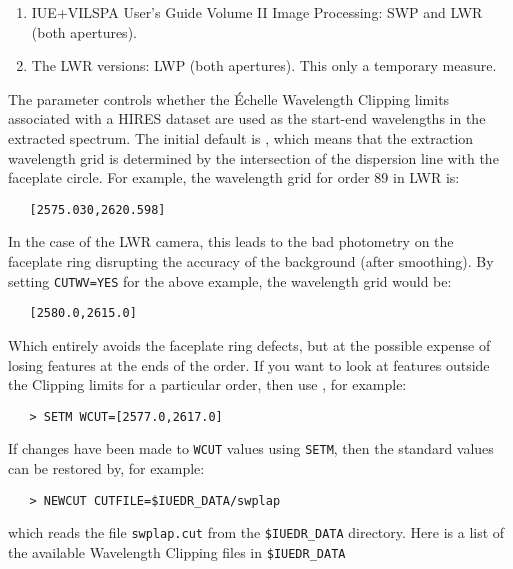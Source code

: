 \begin{enumerate}

\item IUE+VILSPA User's Guide Volume II Image Processing: SWP and LWR (both
      apertures)\@.

\item The LWR versions: LWP (both apertures)\@.  This only a temporary measure.

\end{enumerate}

The 
 parameter controls whether the \'{E}chelle Wavelength Clipping
limits associated with a HIRES dataset are used as the start-end wavelengths
in the extracted spectrum.  The initial default is
, which
means that the extraction wavelength grid is determined by the intersection of
the dispersion line with the faceplate circle.  For example, the wavelength
grid for order 89 in LWR is:

\begin{verbatim}
   [2575.030,2620.598]
\end{verbatim}

In the case of the LWR camera, this leads to the bad photometry on the
faceplate ring disrupting the accuracy of the background (after smoothing).  By
setting \verb+CUTWV=YES+ for the above example, the wavelength grid would be:

\begin{verbatim}
   [2580.0,2615.0]
\end{verbatim}

Which entirely avoids the faceplate ring defects, but at the possible expense
of losing features at the ends of the order.  If you want to look at features
outside the Clipping limits for a particular order, then use
, for example:

\begin{verbatim}
   > SETM WCUT=[2577.0,2617.0]
\end{verbatim}

If changes have been made to \verb+WCUT+ values using \verb+SETM+, then the
standard values can be restored by, for example:

\begin{verbatim}
   > NEWCUT CUTFILE=$IUEDR_DATA/swplap
\end{verbatim}

which reads the file \verb+swplap.cut+ from the \verb+$IUEDR_DATA+
directory.  Here is a list of the available Wavelength Clipping files
in \verb+$IUEDR_DATA+

